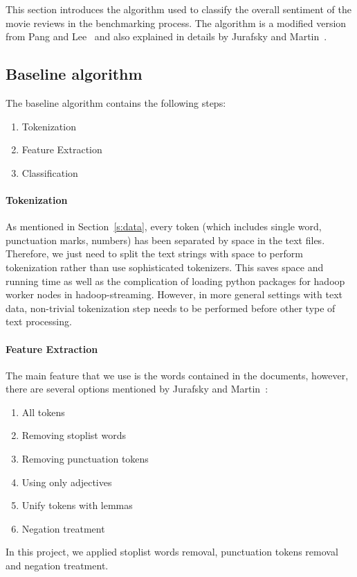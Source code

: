 This section introduces the algorithm used to classify the overall sentiment 
of the movie reviews in the benchmarking process. The algorithm is a 
modified version from Pang and 
Lee~\cite{hid-sp18-405-sentiment-pang2004asentimental} and also 
explained in details by Jurafsky and 
Martin~\cite{hid-sp18-405-sentiment-jurafsky2009}. 

\subsection{Baseline algorithm}
\label{ss:base}

The baseline algorithm contains the following steps:

\begin{enumerate}
	\item Tokenization
	\item Feature Extraction
	\item Classification
\end{enumerate}

\paragraph{Tokenization}
As mentioned in Section~\ref{s:data}, every token (which includes 
single word, punctuation marks, numbers) has been separated by space in 
the text files. Therefore, we just need to split the text strings with space to 
perform tokenization rather than use sophisticated tokenizers. This saves 
space and running time as well as the complication of loading  python 
packages for hadoop worker nodes in hadoop-streaming. However, in more 
general settings with text data, non-trivial tokenization step needs to be 
performed before other type of text processing.

\paragraph{Feature Extraction}
The main feature that we use is the words contained in the documents, 
however, there are several options mentioned by Jurafsky and 
Martin~\cite{hid-sp18-405-sentiment-jurafsky2009}: 
\begin{enumerate}
	\item All tokens
	\item Removing stoplist words
	\item Removing punctuation tokens
	\item Using only adjectives
	\item Unify tokens with lemmas
	\item Negation treatment
\end{enumerate}
In this project, we applied stoplist words removal, punctuation tokens 
removal and negation treatment. 

